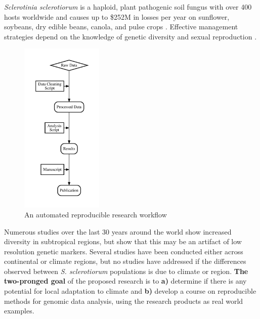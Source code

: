 \documentclass[12pt,letterpaper]{article}
\begin{document}

\textit{Sclerotinia sclerotiorum} is a haploid, plant pathogenic soil fungus with over 400 hosts worldwide \citep{bolton2006sclerotinia} and causes up to \$252M in losses per year on sunflower, soybeans, dry edible beans, canola, and pulse crops \citep{uscanola}. 
Effective management strategies depend on the knowledge of genetic diversity and sexual reproduction \citep{grunwald2016population}.

\lipsum[1-3]


\begin{figure}  %
  \includegraphics[width=0.35\textwidth]{figure/rr.pdf}
  \caption{An automated reproducible research workflow}
  \label{fig:rr}
\end{figure}


Numerous studies over the last 30 years around the world show increased diversity in subtropical regions, but \citet{lehner2017sclerotinia} show that this may be an artifact of low resolution genetic markers.
Several studies have been conducted either across continental or climate regions, but no studies have addressed if the differences observed between \textit{S. sclerotiorum} populations is due to climate or region. 
\textbf{The two-pronged goal} of the proposed research is to \textbf{a)} determine if there is any potential for local adaptation to climate and \textbf{b)} develop a course on reproducible methods for genomic data analysis, using the research products as real world examples. 
\end{document}
